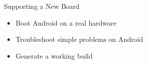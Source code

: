 \setuplabframe
{Supporting a New Board}
{
  \begin{itemize}
  \item Boot Android on a real hardware
  \item Troubleshoot simple problems on Android
  \item Generate a working build
  \end{itemize}
}